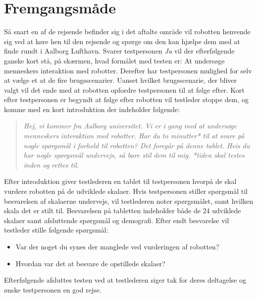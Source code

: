 \section{Fremgangsmåde}
\label{TestAfSkalaFremgangsmaade}
%
Så snart en af de rejsende befinder sig i det aftalte område vil robotten henvende sig ved at køre hen til den rejsende og spørge om den kan hjælpe dem med at finde rundt i Aalborg Lufthavn. Svarer testpersonen \textit{Ja} vil der efterfølgende ganske kort stå, på skærmen, hvad formålet med testen er: At undersøge menneskers interaktion med robotter.
Derefter har testpersonen mulighed for selv at vælge et at de fire brugsscenarier. Uanset hvilket brugsscenarie, der bliver valgt vil det ende med at robotten opfordre testpersonen til at følge efter. Kort efter testpersonen er begyndt at følge efter robotten vil testleder stoppe dem, og komme med en kort introduktion der indeholder følgende: 
%
\begin{quotation}
\noindent
\textit{Hej, vi kommer fra Aalborg universitet. Vi er i gang med at undersøge menneskers interaktion med robotter. Har du to minutter* til at svare på nogle spørgsmål i forhold til robotten? Det foregår på denne tablet. Hvis du har nogle spørgsmål undervejs, så bare stil dem til mig. *tiden skal testes inden og rettes til.}
\end{quotation}
%
Efter introduktion giver testlederen en tablet til testpersonen hvorpå de skal vurdere robotten på de udviklede skalaer. Hvis testpersonen stiller spørgsmål til besvarelsen af skalaerne undervejs, vil testlederen noter spørgsmålet, samt hvilken skala det er stilt til. \blankline
%
Besvarelsen på tabletten indeholder både de 24 udviklede skalaer samt afsluttende spørgsmål og demografi. \blankline
%
Efter endt besvarelse vil testleder stille følgende spørgsmål: 
\begin{itemize}
	\item Var der noget du synes der manglede ved vurderingen af robotten? 
	\item Hvordan var det at besvare de opstillede skalaer? 
\end{itemize} \blankline
%
Efterfølgende afsluttes testen ved at testlederen siger tak for deres deltagelse og ønske testpersonen en god rejse.